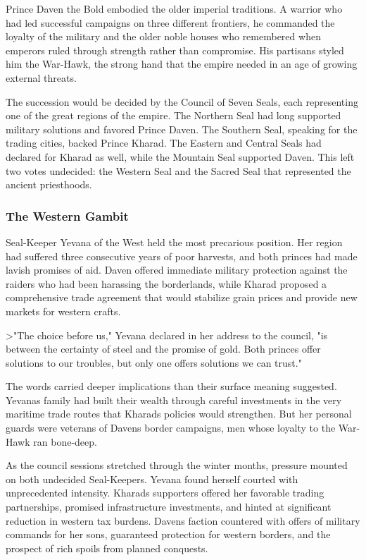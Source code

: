 Prince Daven the Bold embodied the older imperial traditions. A warrior
who had led successful campaigns on three different frontiers, he
commanded the loyalty of the military and the older noble houses who
remembered when emperors ruled through strength rather than compromise.
His partisans styled him the War-Hawk, the strong hand that the empire
needed in an age of growing external threats.

The succession would be decided by the Council of Seven Seals, each
representing one of the great regions of the empire. The Northern Seal
had long supported military solutions and favored Prince Daven. The
Southern Seal, speaking for the trading cities, backed Prince Kharad.
The Eastern and Central Seals had declared for Kharad as well, while the
Mountain Seal supported Daven. This left two votes undecided: the
Western Seal and the Sacred Seal that represented the ancient
priesthoods.

\subsubsection{The Western Gambit}\label{the-western-gambit}

Seal-Keeper Yevana of the West held the most precarious position. Her
region had suffered three consecutive years of poor harvests, and both
princes had made lavish promises of aid. Daven offered immediate
military protection against the raiders who had been harassing the
borderlands, while Kharad proposed a comprehensive trade agreement that
would stabilize grain prices and provide new markets for western crafts.

\textgreater"The choice before us," Yevana declared in her address to
the council, "is between the certainty of steel and the promise of gold.
Both princes offer solutions to our troubles, but only one offers
solutions we can trust."

The words carried deeper implications than their surface meaning
suggested. Yevana\textquotesingle s family had built their wealth
through careful investments in the very maritime trade routes that
Kharad\textquotesingle s policies would strengthen. But her personal
guards were veterans of Daven\textquotesingle s border campaigns, men
whose loyalty to the War-Hawk ran bone-deep.

As the council sessions stretched through the winter months, pressure
mounted on both undecided Seal-Keepers. Yevana found herself courted
with unprecedented intensity. Kharad\textquotesingle s supporters
offered her favorable trading partnerships, promised infrastructure
investments, and hinted at significant reduction in western tax burdens.
Daven\textquotesingle s faction countered with offers of military
commands for her sons, guaranteed protection for western borders, and
the prospect of rich spoils from planned conquests.

